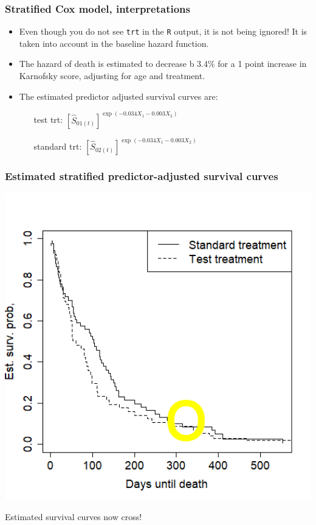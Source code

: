 \begin{frame}[fragile]
\frametitle{Stratified Cox model, interpretations}
\begin{itemize}
\item Even though you do not see \texttt{trt} in the \texttt{R} output, it is not being ignored!  It is taken into account in the baseline hazard function.
\item The hazard of death is estimated to decrease b 3.4\% for a 1 point increase in Karnofsky score, adjusting for age and treatment.
\item The estimated predictor adjusted survival curves are:
\begin{itemize}
\item[test trt:] $\displaystyle \left[\hat{S}_{01(t)} \right]^{\exp\left(-0.034X_1-0.003X_2 \right)}$
\item[standard trt:] $\displaystyle \left[\hat{S}_{02(t)} \right]^{\exp\left(-0.034X_1-0.003X_2 \right)}$
\end{itemize}
\end{itemize}
\end{frame}

\begin{frame}
\frametitle{Estimated stratified predictor-adjusted survival curves}
\begin{minipage}{0.60\textwidth}
\includegraphics[width=1.0\textwidth, clip, trim={0 0cm 0cm 0cm}]{Figures/stratified_cox.png}
\end{minipage}
\blankcolumn
\begin{minipage}{0.30\textwidth}
Estimated survival curves now cross!
\end{minipage}
\end{frame}

